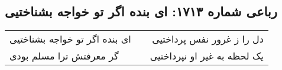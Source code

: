 \begin{center}
\section*{رباعی شماره ۱۷۱۳: ای بنده اگر تو خواجه بشناختیی}
\label{sec:1713}
\begin{longtable}{l p{0.5cm} r}
ای بنده اگر تو خواجه بشناختیی
&&
دل را ز غرور نفس پرداختیی
\\
گر معرفتش ترا مسلم بودی
&&
یک لحظه به غیر او نپرداختیی
\\
\end{longtable}
\end{center}
